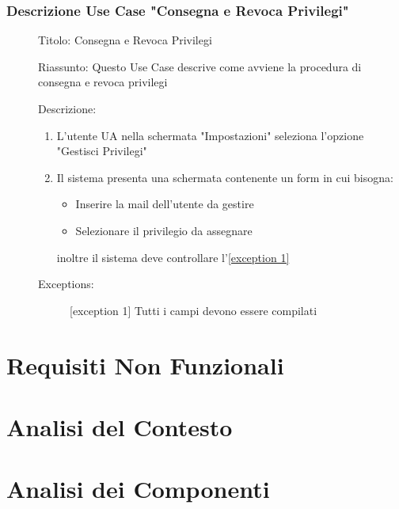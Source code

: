 \documentclass{article}
\let\origthesubsection\thesubsection
\begin{document}
\subsubsection*{Descrizione Use Case "Consegna e Revoca Privilegi"}
\begin{description}
    \item[] Titolo: Consegna e Revoca Privilegi
    \item[] Riassunto: Questo Use Case descrive come avviene la procedura di consegna e revoca privilegi
    \item[] Descrizione:
        \begin{enumerate}
            \item L'utente UA nella schermata "Impostazioni" seleziona l'opzione "Gestisci Privilegi"
            \item Il sistema presenta una schermata contenente un form in cui bisogna:
                  \begin{itemize}
                      \item Inserire la mail dell'utente da gestire
                      \item Selezionare il privilegio da assegnare
                  \end{itemize}
                  inoltre il sistema deve controllare l'\hyperref[exc:15.1]{[exception 1]}
        \end{enumerate}
    \item[] Exceptions:
        \begin{description}
            \item[] \label{exc:15.1} [exception 1] Tutti i campi devono essere compilati
        \end{description}
\end{description}
\renewcommand\thesubsection{\origthesubsection}
\clearpage
\section{Requisiti Non Funzionali}
\begin{description}
    \item[]
\end{description}
\clearpage
\section{Analisi del Contesto}
\begin{description}
    \item[]
\end{description}
\clearpage
\section{Analisi dei Componenti}
\begin{description}
    \item[]
\end{description}
\end{document}
